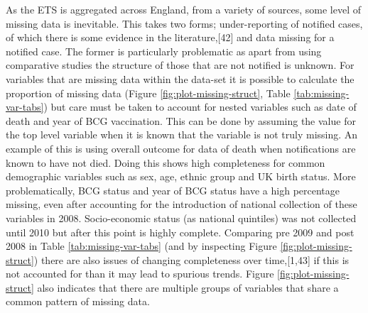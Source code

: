 \documentclass[11pt,twoside]{bristolthesis}
\begin{document}
  As the ETS is aggregated across England, from a variety of sources, some level of missing data is inevitable. This takes two forms; under-reporting of notified cases, of which there is some evidence in the literature,{[}42{]} and data missing for a notified case. The former is particularly problematic as apart from using comparative studies the structure of those that are not notified is unknown. For variables that are missing data within the data-set it is possible to calculate the proportion of missing data (Figure \ref{fig:plot-missing-struct}, Table \ref{tab:missing-var-tabs}) but care must be taken to account for nested variables such as date of death and year of BCG vaccination. This can be done by assuming the value for the top level variable when it is known that the variable is not truly missing. An example of this is using overall outcome for data of death when notifications are known to have not died. Doing this shows high completeness for common demographic variables such as sex, age, ethnic group and UK birth status. More problematically, BCG status and year of BCG status have a high percentage missing, even after accounting for the introduction of national collection of these variables in 2008. Socio-economic status (as national quintiles) was not collected until 2010 but after this point is highly complete. Comparing pre 2009 and post 2008 in Table \ref{tab:missing-var-tabs} (and by inspecting Figure \ref{fig:plot-missing-struct}) there are also issues of changing completeness over time,{[}1,43{]} if this is not accounted for than it may lead to spurious trends. Figure \ref{fig:plot-missing-struct} also indicates that there are multiple groups of variables that share a common pattern of missing data.
\end{document}
